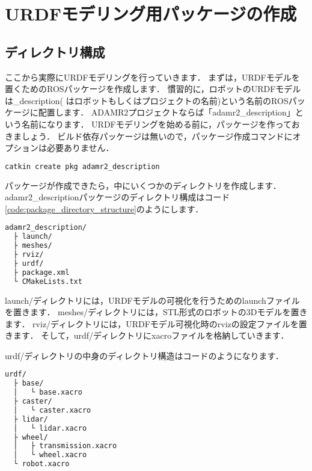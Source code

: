 \documentclass[{../../master}]{subfiles}
\begin{document}
\section{URDFモデリング用パッケージの作成}

\subsection{ディレクトリ構成}

ここから実際にURDFモデリングを行っていきます．
まずは，URDFモデルを置くためのROSパッケージを作成します．
慣習的に，ロボットのURDFモデルは\textsf{\*\_description}(\* はロボットもしくはプロジェクトの名前)という名前のROSパッケージに配置します．
ADAMR2プロジェクトならば「\textsf{adamr2\_description}」という名前になります．
URDFモデリングを始める前に，パッケージを作っておきましょう．
ビルド依存パッケージは無いので，パッケージ作成コマンドにオプションは必要ありません．

\begin{lstlisting}[language=sh, caption=Create a Package to put the URDF Model in]
catkin create pkg adamr2_description
\end{lstlisting}

パッケージが作成できたら，中にいくつかのディレクトリを作成します．
\textsf{adamr2\_description}パッケージのディレクトリ構成はコード\ref{code:package_directory_structure}のようにします．

\begin{lstlisting}[language=sh, caption=Directory Structure of adamr2\_description, label=code:package_directory_structure]
adamr2_description/
  ├ launch/
  ├ meshes/
  ├ rviz/
  ├ urdf/
  ├ package.xml
  └ CMakeLists.txt
\end{lstlisting}

\textsf{launch/}ディレクトリには，URDFモデルの可視化を行うためのlaunchファイルを置きます．
\textsf{meshes/}ディレクトリには，STL形式のロボットの3Dモデルを置きます．
\textsf{rviz/}ディレクトリには，URDFモデル可視化時の\textsf{rviz}の設定ファイルを置きます．
そして，\textsf{urdf/}ディレクトリにxacroファイルを格納していきます．

\textsf{urdf/}ディレクトリの中身のディレクトリ構造はコードのようになります．

\begin{lstlisting}[language=sh, caption=Directory Structure of \textsf{urdf/}, label=code:urdf_directory_structure]
urdf/
  ├ base/
  │   └ base.xacro
  ├ caster/
  │   └ caster.xacro
  ├ lidar/
  │   └ lidar.xacro
  ├ wheel/
  │   ├ transmission.xacro
  │   └ wheel.xacro
  └ robot.xacro
\end{lstlisting}
\end{document}

